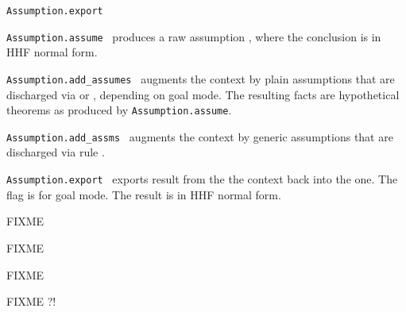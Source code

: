 \begin{isabellebody}
\begin{isamarkuptext}
\begin{description}
  \item \verb|Assumption.export|

  \item \verb|Assumption.assume|~ produces a raw assumption
  , where the conclusion  is in HHF normal
  form.

  \item \verb|Assumption.add_assumes|~ augments the context
  by plain assumptions that are discharged via  or
  , depending on goal mode.  The resulting facts are
  hypothetical theorems as produced by \verb|Assumption.assume|.

  \item \verb|Assumption.add_assms|~ augments the context
  by generic assumptions that are discharged via rule .

  \item \verb|Assumption.export|~
  exports result  from the the  context
  back into the  one.  The  flag is
   for goal mode.  The result is in HHF normal form.

  \end{description}%
\end{isamarkuptext}%
\isamarkuptrue%
%
\endisatagmlref
{\isafoldmlref}%
%
\isadelimmlref
%
\endisadelimmlref
%
\isamarkuptrue%
%
\begin{isamarkuptext}%
FIXME%
\end{isamarkuptext}%
\isamarkuptrue%
%
\isamarkuptrue%
%
\begin{isamarkuptext}%
FIXME



%
\end{isamarkuptext}%
\isamarkuptrue%
%
\isamarkuptrue%
%
\begin{isamarkuptext}%
FIXME%
\end{isamarkuptext}%
\isamarkuptrue%
%
\isamarkuptrue%
%
\begin{isamarkuptext}%
FIXME ?!%
\end{isamarkuptext}%
\isamarkuptrue%
%
\isadelimtheory
%
\endisadelimtheory
%
\isatagtheory
{}\isamarkupfalse%
%
\endisatagtheory
{\isafoldtheory}%
%
\isadelimtheory
%
\endisadelimtheory
\isanewline
\end{isabellebody}%

